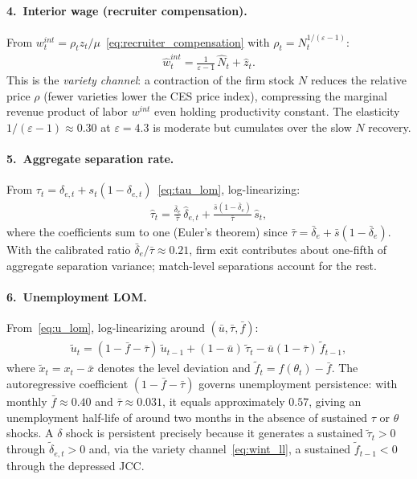 \documentclass[authoryear, review, 12pt]{elsarticle}
\begin{document}
\paragraph{4.\ Interior wage (recruiter compensation).}
From $w_t^{int} = \rho_t z_t/\mu$~\eqref{eq:recruiter_compensation} with
$\rho_t = N_t^{1/(\varepsilon-1)}$:
\begin{align}\label{eq:wint_ll}
    \hat{w}_t^{int} = \frac{1}{\varepsilon-1}\,\hat{N}_t + \hat{z}_t.
\end{align}
This is the \emph{variety channel}: a contraction of the firm stock $N$
reduces the relative price $\rho$ (fewer varieties lower the CES price
index), compressing the marginal revenue product of labor $w^{int}$ even
holding productivity constant.  The elasticity $1/(\varepsilon-1)\approx0.30$
at $\varepsilon=4.3$ is moderate but cumulates over the slow $N$ recovery.

\paragraph{5.\ Aggregate separation rate.}
From $\tau_t = \delta_{e,t}+s_t(1-\delta_{e,t})$~\eqref{eq:tau_lom},
log-linearizing:
\begin{align}\label{eq:tau_ll}
    \hat\tau_t
    = \frac{\bar\delta_e}{\bar\tau}\,\hat\delta_{e,t}
    + \frac{\bar{s}(1-\bar\delta_e)}{\bar\tau}\,\hat{s}_t,
\end{align}
where the coefficients sum to one (Euler's theorem) since
$\bar\tau=\bar\delta_e+\bar{s}(1-\bar\delta_e)$.  With the calibrated ratio
$\bar\delta_e/\bar\tau\approx0.21$, firm exit contributes about one-fifth of
aggregate separation variance; match-level separations account for the rest.

\paragraph{6.\ Unemployment LOM.}
From~\eqref{eq:u_lom}, log-linearizing around $(\bar{u},\bar\tau,\bar{f})$:
\begin{align}\label{eq:u_ll}
    \tilde{u}_{t}
    = (1-\bar{f}-\bar\tau)\,\tilde{u}_{t-1}
    + (1-\bar{u})\,\tilde\tau_t
    - \bar{u}(1-\bar\tau)\,\tilde{f}_{t-1},
\end{align}
where $\tilde{x}_t = x_t-\bar{x}$ denotes the level deviation and
$\tilde{f}_t = f(\theta_t)-\bar{f}$.  The autoregressive coefficient
$(1-\bar{f}-\bar\tau)$ governs unemployment persistence: with monthly
$\bar{f}\approx0.40$ and $\bar\tau\approx0.031$, it equals approximately
$0.57$, giving an unemployment half-life of around two months in the absence
of sustained $\tau$ or $\theta$ shocks.  A $\delta$ shock is persistent
precisely because it generates a sustained $\tilde\tau_t>0$ through
$\tilde\delta_{e,t}>0$ and, via the variety channel~\eqref{eq:wint_ll}, a
sustained $\tilde{f}_{t-1}<0$ through the depressed JCC.
\end{document}
